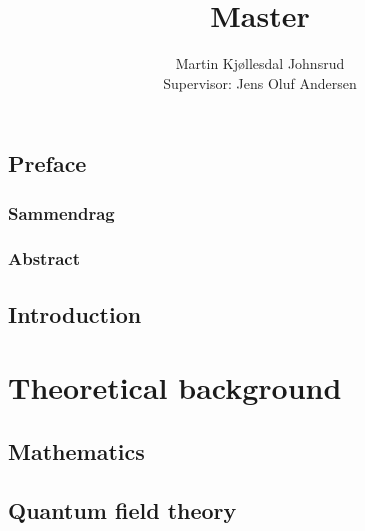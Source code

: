 \documentclass[11pt, a4paper]{book}
\title{\huge{Master}}
\author{
    \large{Martin Kjøllesdal Johnsrud}\\
    \normalsize{Supervisor: Jens Oluf Andersen}
    }
\begin{document}
    \maketitle
    \frontmatter
    
    \chapter*{Preface}
    
    \clearpage

    \section*{Sammendrag}
    
    \clearpage
    
    \section*{Abstract}
    


    \cleardoublepage

    \setcounter{tocdepth}{1}
    \tableofcontents
   
    \setlength{\parindent}{0em}
    \setlength{\parskip}{0.8em}

    \mainmatter

    
    \chapter{Introduction}
    \label{chapter: introduction}
    

    \part{Theoretical background}
    \label{part: theoretical background}

    \chapter{Mathematics}
    \label{chapter: math}
    
    

    \chapter{Quantum field theory}
    \label{chapter: QFT}
    
    
    
    
    
\end{document}
